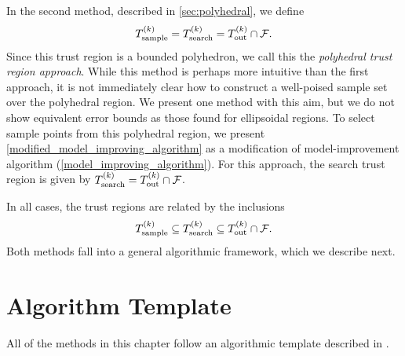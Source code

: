 \documentclass{article}
\begin{document}


In the second method,  described in \cref{sec:polyhedral}, we define 
\begin{align*}
{T_{\text{sample}}^{(k)}} = {T_{\text{search}}^{(k)}} = {T_{\text{out}}^{(k)}} \cap {\mathcal F}.
\end{align*}
Since this trust region is a bounded polyhedron,  we call this the {\em polyhedral trust region approach}.
While this method is perhaps more intuitive than the first approach,
it is not immediately clear how to construct a well-poised sample set over the polyhedral region.
We present one method with this aim, but we do not show equivalent error bounds as those found for ellipsoidal regions.
To select sample points from this polyhedral region, 
we present \cref{modified_model_improving_algorithm} as a modification of model-improvement algorithm (\cref{model_improving_algorithm}).
For this approach, the search trust region is given by ${T_{\text{search}}^{(k)}} = {T_{\text{out}}^{(k)}} \cap {\mathcal F}$.

In all cases, the trust regions are related by the inclusions
\begin{align*}
{T_{\text{sample}}^{(k)}} \subseteq {T_{\text{search}}^{(k)}} \subseteq {T_{\text{out}}^{(k)}} \cap {\mathcal F}.
\end{align*}
Both methods fall into a general algorithmic framework, which we describe next.


\section{Algorithm Template}\label{sec:template}

All of the methods in this chapter follow
an algorithmic template described in \cite{Conejo:2013:GCT:2620806.2621814}.

\end{document}
